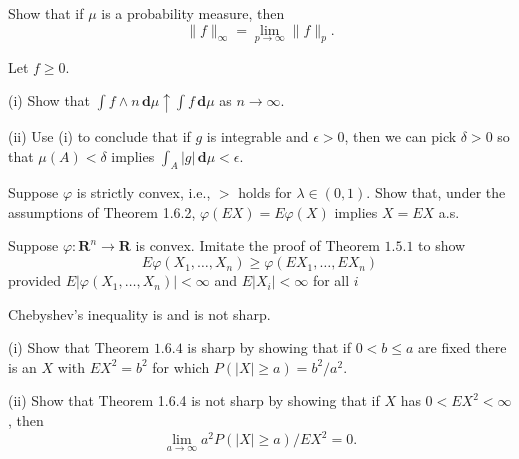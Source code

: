 \documentclass[en, normal, 11pt, black]{elegantnote}
\newenvironment{exercise}[1]{\begin{tcolorbox}[colback=black!15, colframe=black!80, title=#1]}{\end{tcolorbox}}
\newcommand{\der}{\,\mathbf{d}}
\begin{document}
    \begin{exercise}{1.5.2.}
        Show that if $\mu$ is a probability measure, then
        $$
        \|f\|_{\infty}=\lim _{p \rightarrow \infty}\|f\|_{p}.
        $$
    \end{exercise}

    \begin{exercise}{1.5.7.}
        Let $f \geq 0$. 
        
        (i) Show that $\int f \wedge n \der \mu \uparrow \int f \der \mu$ as $n \rightarrow \infty$. 
        
        (ii) Use (i) to conclude that if $g$ is integrable and $\epsilon>0$, then we can pick $\delta>0$ so that $\mu(A)<\delta$ implies $\int_{A}|g| \der \mu<\epsilon$. 
    \end{exercise}

    \begin{exercise}{1.6.1.}
        Suppose $\varphi$ is strictly convex, i.e., $>$ holds for $\lambda \in(0,1) .$ Show that, under the assumptions of Theorem 1.6.2, $\varphi(E X)=E \varphi(X)$ implies $X=E X$ a.s. 
    \end{exercise}
    \begin{exercise}{1.6.2.}
        Suppose $\varphi: \mathbf{R}^{n} \rightarrow \mathbf{R}$ is convex. Imitate the proof of Theorem $1.5 .1$ to show
        $$
        E \varphi\left(X_{1}, \ldots, X_{n}\right) \geq \varphi\left(E X_{1}, \ldots, E X_{n}\right)
        $$
        provided $E\left|\varphi\left(X_{1}, \ldots, X_{n}\right)\right|<\infty$ and $E\left|X_{i}\right|<\infty$ for all $i$
    \end{exercise}
    \begin{exercise}{1.6.3.}
        Chebyshev's inequality is and is not sharp. 
        
        (i) Show that Theorem $1.6.4$ is sharp by showing that if $0<b \leq a$ are fixed there is an $X$ with $E X^{2}=b^{2}$ for which $P(|X| \geq a)=b^{2} / a^{2}$. 
        
        (ii) Show that Theorem 1.6.4 is not sharp by showing that if $X$ has $0<E X^{2}<\infty$, then
        $$
        \lim _{a \rightarrow \infty} a^{2} P(|X| \geq a) / E X^{2}=0. 
        $$
    \end{exercise}
\end{document}
